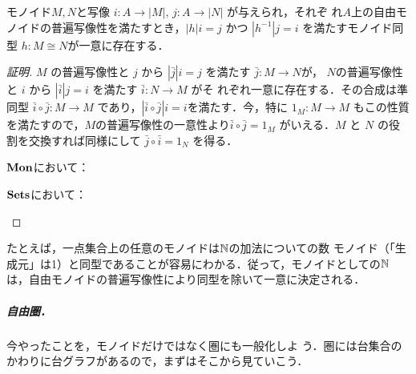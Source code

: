 \begin{prop}
 モノイド$M, N$と写像 $i: A \to |M|,\, j: A \to |N|$ が与えられ，それぞ
 れ$A$上の自由モノイドの普遍写像性を満たすとき，$|h|i = j$ かつ
 $|h^{-1}|j=i$ を満たすモノイド同型 
 $h: M \cong N$が一意に存在する．
\end{prop}
\begin{proof}[証明]
 $M$ の普遍写像性と $j$ から $|\bar j|i = j$ を満たす $\bar j: M \to N$が，
 $N$の普遍写像性と $i$ から $|\bar i|j = i$ を満たす $\bar i: N \to M$ がそ
 れぞれ一意に存在する．その合成は準同型 $\bar i \circ \bar j: M \to M$
 であり，$|\bar i \circ \bar j|i = i$を満たす．今，特に $1_M: M \to M$
 もこの性質
 を満たすので，$M$の普遍写像性の一意性より$\bar i \circ \bar j =
 1_M$ がいえる．$M$ と $N$ の役割を交換すれば同様にして $\bar j \circ
 \bar i = 1_N$ を得る．

 $\mathbf{Mon}$において：
 \begin{center}
 \end{center}

 $\mathbf{Sets}$において：
 \begin{center}
 \end{center}
\end{proof}

たとえば，一点集合上の任意のモノイドは$\mathbb{N}$の加法についての数
モノイド（「生成元」は1）と同型であることが容易にわかる．従って，モノイドとしての$\mathbb{N}$
は，自由モノイドの普遍写像性により同型を除いて一意に決定される．

\subparagraph{自由圏．}
今やったことを，モノイドだけではなく圏にも一般化しよ
う．圏には台集合のかわりに台グラフがあるので，まずはそこから見ていこう．

